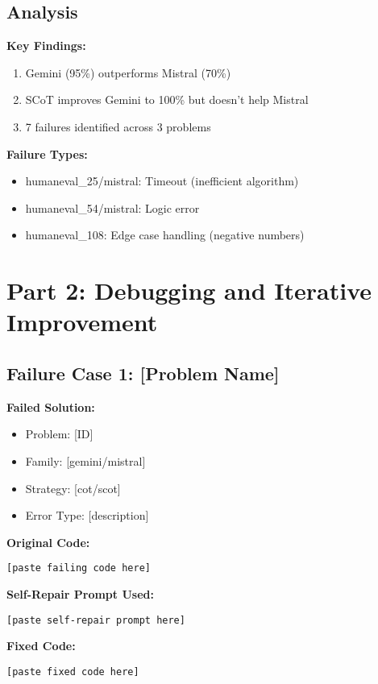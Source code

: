\documentclass[11pt]{article}
\begin{document}
\subsection{Analysis}

\textbf{Key Findings:}
\begin{enumerate}
    \item Gemini (95\%) outperforms Mistral (70\%)
    \item SCoT improves Gemini to 100\% but doesn't help Mistral
    \item 7 failures identified across 3 problems
\end{enumerate}

\textbf{Failure Types:}
\begin{itemize}
    \item humaneval\_25/mistral: Timeout (inefficient algorithm)
    \item humaneval\_54/mistral: Logic error
    \item humaneval\_108: Edge case handling (negative numbers)
\end{itemize}

\newpage
\section{Part 2: Debugging and Iterative Improvement}

\subsection{Failure Case 1: [Problem Name]}

\textbf{Failed Solution:}
\begin{itemize}
    \item Problem: [ID]
    \item Family: [gemini/mistral]
    \item Strategy: [cot/scot]
    \item Error Type: [description]
\end{itemize}

\textbf{Original Code:}
\begin{lstlisting}
[paste failing code here]
\end{lstlisting}

\textbf{Self-Repair Prompt Used:}
\begin{lstlisting}
[paste self-repair prompt here]
\end{lstlisting}

\textbf{Fixed Code:}
\begin{lstlisting}
[paste fixed code here]
\end{lstlisting}
\end{document}
